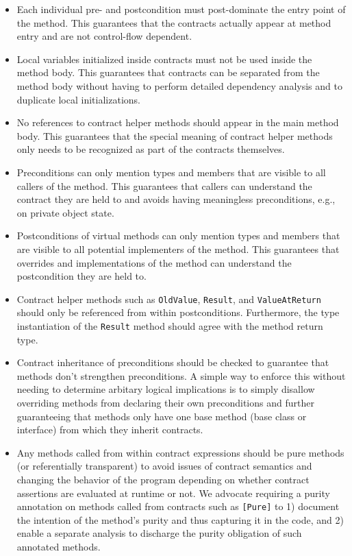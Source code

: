 \documentclass{sig-alternate}
\newcommand{\code}[1]{\lstinline{#1}}
\begin{document}
\begin{itemize}
\item Each individual pre- and postcondition must post-do\-minate the
  entry point of the method. This guarantees that the contracts
  actually appear at method entry and are not control-flow dependent.

\item Local variables initialized inside contracts must not be used inside
  the method body. This guarantees that contracts can be separated
  from the method body without having to perform detailed dependency
  analysis and to duplicate local initializations.

\item No references to contract helper methods should appear in the
  main method body. This guarantees that the special meaning of
  contract helper methods only needs to be recognized as part of the
  contracts themselves.

\item Preconditions can only mention types and members that are
  visible to all callers of the method. This guarantees that callers
  can understand the contract they are held to and avoids having
  meaningless preconditions, e.g., on private object state.

\item Postconditions of virtual methods can only mention types and members that are
  visible to all potential implementers of the method. This guarantees
  that overrides and implementations of the method 
  can understand the postcondition they are held to.

\item Contract helper methods such as \lstinline{OldValue},
  \lstinline{Result}, and \lstinline{ValueAtReturn} should only be
  referenced from within postconditions. Furthermore, the type
  instantiation of the \code{Result} method should agree with the
  method return type.

\item Contract inheritance of preconditions should be checked to
  guarantee that methods don't strengthen preconditions. A simple way to
  enforce this without needing to determine arbitary logical
  implications is to simply disallow overriding methods from declaring
  their own preconditions and further guaranteeing that methods only
  have one base method (base class or interface) from which they
  inherit contracts.

\item Any methods called from within contract expressions should be
  pure methods (or referentially transparent) to avoid issues of
  contract semantics and changing the behavior of the program
  depending on whether contract assertions are evaluated at runtime or
  not.  We advocate
  requiring a purity annotation on methods called from contracts such
  as \code{[Pure]} to 1) document the intention of the method's purity
  and thus capturing it in the code, and 2) enable a separate analysis
  to discharge the purity obligation of such annotated methods.


\end{itemize}
\end{document}
